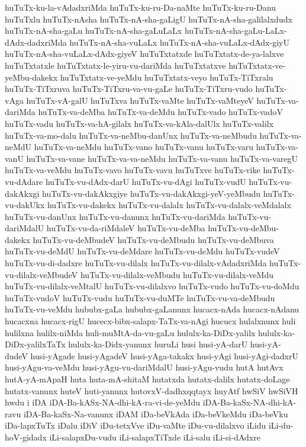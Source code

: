 {huTuTx-ku-la-vAdadxriMda
huTuTx-ku-ru-Da-naMte
huTuTx-ku-ru-Danu
huTuTxlu
huTuTx-nAsha
huTuTx-nA-sha-gaLigU
huTuTx-nA-sha-galilalxdudx
huTuTx-nA-sha-gaLu
huTuTx-nA-sha-gaLuLaLx
huTuTx-nA-sha-gaLu-LaLx-dAdx-dadxriMda
huTuTx-nA-sha-vuLaLx
huTuTx-nA-sha-vuLaLx-dAdx-giyU
huTuTx-nA-sha-vuLaLx-dAdx-giyeV
huTuTxtatxde
huTuTxtatx-de-ya-lalxve
huTuTxtatxle
huTuTxtatx-le-yiru-vu-dariMda
huTuTxtatxve
huTuTxtatx-ve-yeMbu-dakekx
huTuTxtatx-ve-yeMdu
huTuTxtatx-veyo
huTuTx-TiTxralu
huTuTx-TiTxruva
huTuTx-TiTxru-va-vu-gaLe
huTuTx-TiTxru-vudo
huTuTx-vAga
huTuTx-vA-galU
huTuTxva
huTuTx-vaMte
huTuTx-vaMteyeV
huTuTx-va-dariMda
huTuTx-va-deMba
huTuTx-va-deMdu
huTuTx-vado
huTuTx-vadoV
huTuTx-vadu
huTuTx-va-hA-gilalx
huTuTx-va-kAla-dalUlx
huTuTx-valilx
huTuTx-va-mo-dalu
huTuTx-va-neMbu-danUnx
huTuTx-va-neMbudu
huTuTx-va-neMdU
huTuTx-va-neMdu
huTuTx-vano
huTuTx-vanu
huTuTx-varu
huTuTx-va-vanU
huTuTx-va-vane
huTuTx-va-va-neMdu
huTuTx-va-vanu
huTuTx-va-varegU
huTuTx-va-veMdu
huTuTx-vavo
huTuTx-vavu
huTuTxve
huTuTx-vike
huTuTx-vu-dAdare
huTuTx-vu-dAdx-darU
huTuTx-vu-dAgi
huTuTx-vudU
huTuTx-vu-dakAkxgi
huTuTx-vu-dakAkxgiye
huTuTx-vu-dakAkxgi-yeV-yeMbudu
huTuTx-vu-dakUkx
huTuTx-vu-dakekx
huTuTx-vu-dalalx
huTuTx-vu-dalalx-veMdalalx
huTuTx-vu-danUnx
huTuTx-vu-danunx
huTuTx-vu-dariMda
huTuTx-vu-dariMdalU
huTuTx-vu-da-riMdaleV
huTuTx-vu-deMba
huTuTx-vu-deMbu-dakekx
huTuTx-vu-deMbudeV
huTuTx-vu-deMbudu
huTuTx-vu-deMbuva
huTuTx-vu-deMdU
huTuTx-vu-deMdare
huTuTx-vu-deMdu
huTuTx-vudeV
huTuTx-vu-di-dadxre
huTuTx-vu-dilalx
huTuTx-vu-dilalx-vAdadxriMda
huTuTx-vu-dilalx-veMbudeV
huTuTx-vu-dilalx-veMbudu
huTuTx-vu-dilalx-veMdu
huTuTx-vu-dilalx-veMtalU
huTuTx-vu-dilalxvo
huTuTx-vudo
huTuTx-vu-doMdu
huTuTx-vudoV
huTuTx-vudu
huTuTx-vu-duMTe
huTuTx-vu-va-deMbudu
huTuTx-vu-veMdu
hububx-gaLa
hububx-gaLanunx
hucacx-nAda
hucacx-nAdanu
hucacxna
hucacx-rigU
hucecx-bibx-salapx-TaTx-va-nAgi
hucucx
hulalxnunx
huli
hulilxna
hulilx-niMda
huli-muMtA-da-vu-gaLu
hululx-ka-DiDx-yalilx
hululx-ka-DiDx-yalilxTaTx
hululx-ka-Didx-yanunx
huruLi
husi
husi-yA-darU
husi-yA-dudeV
husi-yAgade
husi-yAgadeV
husi-yAga-takakx
husi-yAgi
husi-yAgi-dadxrU
husi-yAgu-va-veMdu
husi-yAgu-vu-dariMdalU
husi-yAgu-vudu
hutA
hutAvx
hutA-yA-mApaH
huta
huta-mA-shitaM
hutatxda
hutatx-dalilx
hutatx-doLage
hutatx-vanunx
huteV
huti-yanunx
hutovxV-dadhxqqtayx
huyAtf
hwSiV
hwSiVH
hwdu
i
iDA
iDA-Ba-kASx-NA-dhi-kA-ra-vi-de-yeMdu
iDA-Ba-kaSx-NA-dhi-kA-ravu
iDA-Ba-kaSx-Na-vanunx
iDAM
iDa-beVkAda
iDa-beVkeMdu
iDa-beVku
iDa-lapxTuTx
iDalu
iDiV
iDu-tetxVve
iDu-vaMte
iDu-vu-dilalxvo
iLidu
iLi-du-hoV-gidadx
iLi-salapxDu-vudu
iLi-salapxTiTxde
iLi-salu
iLi-si-dAdxre
}
